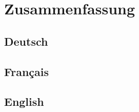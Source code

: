 \section*{Zusammenfassung}


\subsection*{Deutsch}


\subsection*{Français}


\subsection*{English}

